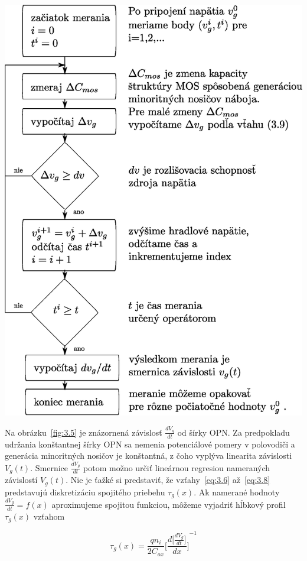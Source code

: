 \begin{diagram}
  \includegraphics[scale=0.55,keepaspectratio]{Figures/diagram-2.EPS}\label{diagram:2}
\end{diagram}

Na obrázku~\ref{fig:3.5} je znázornená závislosť $\frac{dV_g}{dt}$ od
šírky OPN\@. Za predpokladu udržania konštantnej šírky OPN sa nemenia
potenciálové pomery v polovodiči a generácia minoritných nosičov je
konštantná, z čoho vyplýva linearita závislosti $V_g(t)$.  Smernice
$\frac{dV_g}{dt}$ potom možno určiť lineárnou regresiou nameraných
závislostí $V_g(t)$. Nie je ťažké si predstaviť, že
vzťahy~\ref{eq:3.6} až~\ref{eq:3.8} predstavujú diskretizáciu
spojitého priebehu $\tau_g(x)$. Ak namerané hodnoty
$\frac{dV_g}{dt}=f(x)$ aproximujeme spojitou funkciou, môžeme vyjadriť
hĺbkový profil $\tau_g(x)$ vzťahom

\begin{equation}\label{eq:3.10}
  \tau_g(x) = \frac{qn_i}{2C_{ox}} {\Bigg[\frac{d\big[\frac{dV_g}{dt}\big]}{dx}\Bigg]}^{-1}
\end{equation}

